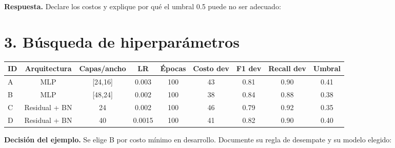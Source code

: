 \documentclass[10pt]{article}
\begin{document}
\vspace{0.6em}
\textbf{Respuesta.} Declare los costos y explique por qué el umbral 0.5 puede no ser adecuado:

\vspace{1.5cm}

\section*{3. Búsqueda de hiperparámetros}
\small
\begin{tabular}{@{}lcccccccc@{}}
\toprule
ID & Arquitectura & Capas/ancho & LR & Épocas & Costo dev & F1 dev & Recall dev & Umbral\\
\midrule
A & MLP & [24,16] & 0.003 & 100 & 43 & 0.81 & 0.90 & 0.41\\
B & MLP & [48,24] & 0.002 & 100 & 38 & 0.84 & 0.88 & 0.38\\
C & Residual + BN & 24 & 0.002 & 100 & 46 & 0.79 & 0.92 & 0.35\\
D & Residual + BN & 40 & 0.0015 & 100 & 41 & 0.82 & 0.90 & 0.40\\
\bottomrule
\end{tabular}
\normalsize

\vspace{0.5em}
\textbf{Decisión del ejemplo.} Se elige B por costo mínimo en desarrollo. Documente su regla de desempate y su modelo elegido:

\vspace{1.5cm}
\end{document}
